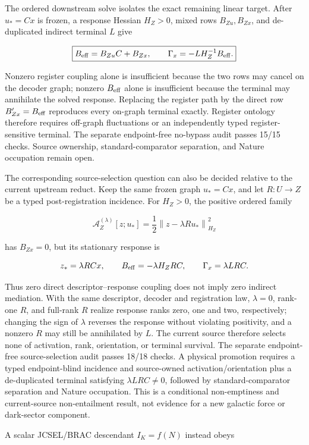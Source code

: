 \documentclass[11pt]{article}
\begin{document}
The ordered downstream solve isolates the exact remaining linear target.
After $u_*=Cx$ is frozen, a response Hessian $H_Z>0$, mixed rows
$B_{Zu},B_{Zx}$, and de-duplicated indirect terminal $L$ give

\[
\boxed{
B_{\rm eff}=B_{Zu}C+B_{Zx},
\qquad
\Gamma_x=-LH_Z^{-1}B_{\rm eff}.}
\]

Nonzero register coupling alone is insufficient because the two rows may
cancel on the decoder graph; nonzero $B_{\rm eff}$ alone is insufficient
because the terminal may annihilate the solved response.  Replacing the
register path by the direct row $B'_{Zx}=B_{\rm eff}$ reproduces every
on-graph terminal exactly.  Register ontology therefore requires off-graph
fluctuations or an independently typed register-sensitive terminal.  The
separate endpoint-free no-bypass audit passes 15/15 checks.  Source ownership,
standard-comparator separation, and Nature occupation remain open.

The corresponding source-selection question can also be decided relative to
the current upstream reduct.  Keep the same frozen graph $u_*=Cx$, and let
$R:U\to Z$ be a typed post-registration incidence.  For $H_Z>0$, the
positive ordered family

\[
\mathcal A_Z^{(\lambda)}[z;u_*]
=\frac12\left\lVert z-\lambda Ru_*\right\rVert_{H_Z}^{2}
\]

has $B_{Zx}=0$, but its stationary response is

\[
z_*=\lambda RCx,
\qquad
B_{\rm eff}=-\lambda H_ZRC,
\qquad
\Gamma_x=\lambda LRC.
\]

Thus zero direct descriptor--response coupling does not imply zero indirect
mediation.  With the same descriptor, decoder and registration law,
$\lambda=0$, rank-one $R$, and full-rank $R$ realize response ranks zero,
one and two, respectively; changing the sign of $\lambda$ reverses the
response without violating positivity, and a nonzero $R$ may still be
annihilated by $L$.  The current source therefore selects none of activation,
rank, orientation, or terminal survival.  The separate endpoint-free
source-selection audit passes 18/18 checks.  A physical promotion requires a
typed endpoint-blind incidence and source-owned activation/orientation plus a
de-duplicated terminal satisfying $\lambda LRC\ne0$, followed by
standard-comparator separation and Nature occupation.  This is a conditional
non-emptiness and current-source non-entailment result, not evidence for a new
galactic force or dark-sector component.

A scalar JCSEL/BRAC descendant $I_K=f(N)$ instead obeys
\end{document}
